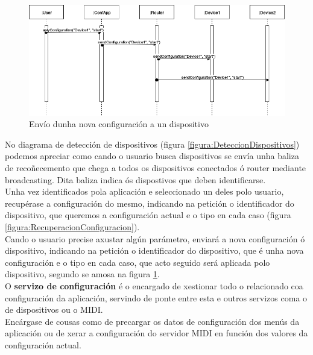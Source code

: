    \begin{figure}[htbp]
    \centering
    \includegraphics[scale=0.5, keepaspectratio=true]{./imagenes/df-apply-config.png}
    \caption{Envío dunha nova configuración a un dispositivo}
    \label{figura:EnvioConfiguracion}
   \end{figure}
   
   No diagrama de detección de dispositivos (figura
   \ref{figura:DeteccionDispositivos}) podemos apreciar como cando o usuario
   busca dispositivos se envía unha baliza de recoñecemento que chega a todos
   os dispositivos conectados ó router mediante broadcasting. Dita baliza indica
   ós dispostivos que deben identificarse. \\
   
   Unha vez identificados pola aplicación e seleccionado un deles polo usuario,
   recupérase a configuración do mesmo, indicando na petición o identificador do
   dispositivo, que queremos a configuración actual e o tipo en cada caso
   (figura \ref{figura:RecuperacionConfiguracion}). \\
   
   Cando o usuario precise axustar algún parámetro, enviará a nova configuración
   ó dispositivo, indicando na petición o identificador do dispositivo, que é
   unha nova configuración e o tipo en cada caso, que acto seguido será aplicada
   polo dispositivo, segundo se amosa na figura
   \ref{figura:EnvioConfiguracion}. \\
   
   O \textbf{servizo de configuración} é o encargado de xestionar todo o
   relacionado coa configuración da aplicación, servindo de ponte entre esta e
   outros servizos coma o de dispositivos ou o MIDI. \\
   
   Encárgase de cousas como de precargar os datos de configuración dos menús
   da aplicación ou de xerar a configuración do servidor MIDI en función dos
   valores da configuración actual. \\
   
